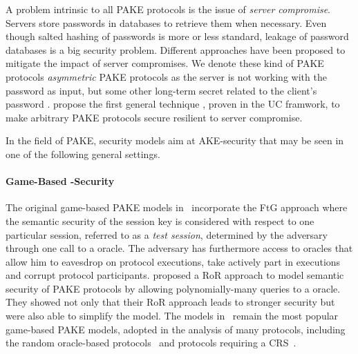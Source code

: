 A problem intrinsic to all \ac{PAKE} protocols is the issue of \emph{server compromise}.
Servers store passwords in databases to retrieve them when necessary.
Even though salted hashing of passwords is more or less standard, leakage of password databases is a big security problem.
Different approaches have been proposed to mitigate the impact of server compromises.
We denote these kind of \ac{PAKE} protocols \emph{asymmetric} \ac{PAKE} protocols as the server is not working with the password as input, but some other long-term secret related to the client's password \cite{Wu1998,Boyen2009a}.
\citeauthor{Gentry2006} propose the first general technique \cite{Gentry2006}, proven in the \ac{UC} framwork, to make arbitrary \ac{PAKE} protocols secure resilient to server compromise.

In the field of \acl{PAKE}, security models aim at \ac{AKE}-security \cite{Bellare1993,Bellare1995} that may be seen in one of the following general settings.

\paragraph{Game-Based -Security}
The original game-based \ac{PAKE} models in~\cite{Bellare2000,Boyko2000} incorporate the \ac{FtG} approach where the semantic security of the session key is considered with respect to one particular session, referred to as a \emph{test session}, determined by the adversary through one call to a \Test oracle.
The adversary has furthermore access to oracles that allow him to eavesdrop on protocol executions, take actively part in executions and corrupt protocol participants.
\citeauthor{Abdalla2005} \cite{Abdalla2005} proposed a \ac{RoR} approach to model semantic security of PAKE protocols by allowing polynomially-many queries to a \Test oracle.
They showed not only that their \ac{RoR} approach leads to stronger security but were also able to simplify the model.
The models in~\cite{Bellare2000,Abdalla2005} remain the most popular game-based PAKE models, adopted in the analysis of many protocols, including the random oracle-based protocols~\cite{Abdalla2006,Abdalla2005b} and protocols requiring a \ac{CRS}~\cite{KatzOY01,Gennaro2003,Gennaro2008,Katz2009a}.



